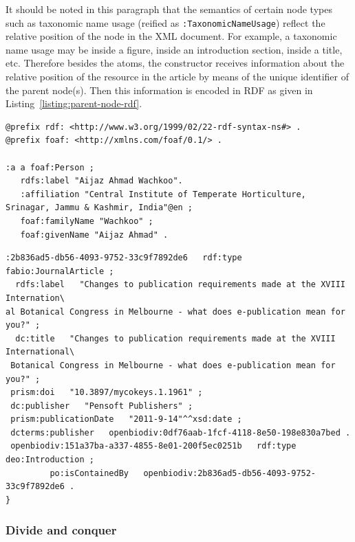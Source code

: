 It should be noted in this paragraph that the semantics of certain node types such as taxonomic name usage (reified as {\tt :TaxonomicNameUsage}) reflect the relative position of the node in the XML document. For example, a taxonomic name usage may be inside a figure, inside an introduction section, inside a title, etc. Therefore besides the atoms, the constructor receives information about the relative position of the resource in the article by means of the unique identifier of the parent node(s). Then this information is encoded in RDF as given in Listing~\ref{listing:parent-node-rdf}. 

\begin{lstlisting}[language=SPARQL,
caption=RDF snippet of an author. This is a somewhat idealized situation in which the language of the address was available from the article., label=listing:author_rdf, basicstyle=\ttfamily\tiny]
@prefix rdf: <http://www.w3.org/1999/02/22-rdf-syntax-ns#> .
@prefix foaf: <http://xmlns.com/foaf/0.1/> .

:a a foaf:Person ;
   rdfs:label "Aijaz Ahmad Wachkoo".
   :affiliation "Central Institute of Temperate Horticulture, Srinagar, Jammu & Kashmir, India"@en ;
   foaf:familyName "Wachkoo" ;
   foaf:givenName "Aijaz Ahmad" .
\end{lstlisting}

\begin{lstlisting}[language=SPARQL,
caption=., label=listing:parent-node-rdf, basicstyle=\ttfamily\tiny]
:2b836ad5-db56-4093-9752-33c9f7892de6   rdf:type   fabio:JournalArticle ;
  rdfs:label   "Changes to publication requirements made at the XVIII Internation\
al Botanical Congress in Melbourne - what does e-publication mean for you?" ;
  dc:title   "Changes to publication requirements made at the XVIII International\
 Botanical Congress in Melbourne - what does e-publication mean for you?" ;
 prism:doi   "10.3897/mycokeys.1.1961" ;
 dc:publisher   "Pensoft Publishers" ;
 prism:publicationDate   "2011-9-14"^^xsd:date ;
 dcterms:publisher   openbiodiv:0df76aab-1fcf-4118-8e50-198e830a7bed .
 openbiodiv:151a37ba-a337-4855-8e01-200f5ec0251b   rdf:type   deo:Introduction ;
         po:isContainedBy   openbiodiv:2b836ad5-db56-4093-9752-33c9f7892de6 .
}
\end{lstlisting}

\subsubsection{Divide and conquer}

